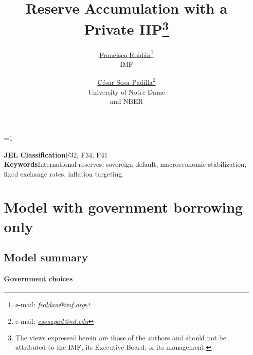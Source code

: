 
\linespread{1.32} %

\def\acknowledgements{}

\title{Reserve Accumulation with a Private IIP\thanks{The views expressed herein are those of the authors and should not be attributed to the IMF, its Executive Board, or its management. \acknowledgements}}

\author{\href{https://fqroldan.github.io}{Francisco Rold\'{a}n}\thanks{e-mail: \href{mailto:froldan@imf.org}{\emph{froldan@imf.org}}}\\IMF \and \href{https://sosapadilla.github.io}{C\'{e}sar Sosa-Padilla}\thanks{e-mail: \href{mailto:csosapad@nd.edu}{\emph{csosapad@nd.edu}}} \\University of Notre Dame\\and NBER}

\ifdefined\ungated
\else
\def\ungated{1}
\fi

\date{\monthname\xspace \the\year %
}


\ifnum\ungated=1%
	\maketitle 
	\begin{abstract}
		\noindent
	\end{abstract}
	\vfill
	\noindent\textbf{JEL Classification}\quad F32, F34, F41\\
	\noindent\textbf{Keywords}\quad International reserves, sovereign default, macroeconomic stabilization, fixed exchange rates, inflation targeting.
	\bigskip
	\vfill
\else
	
	\tableofcontents
\fi
\pagebreak 


\section{Model with government borrowing only}
\subsection{Model summary}
\paragraph{Government choices}

